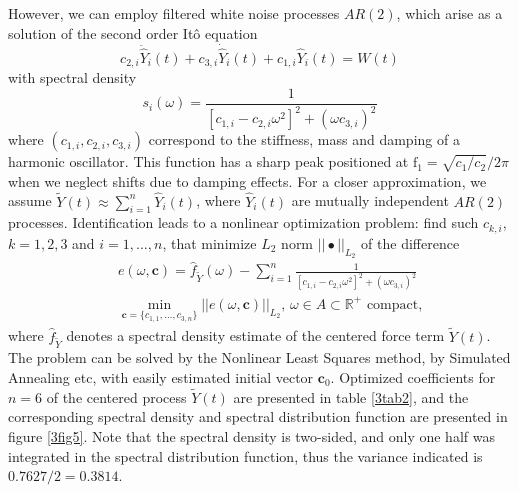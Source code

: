 \documentclass[preprint,12pt,authoryear]{elsarticle}
\newcommand{\bs}[1]{{\boldsymbol{#1}}}
\begin{document}
However, we can employ filtered white noise processes $AR(2)$, which arise as a solution of the second order It\^{o} equation
\begin{equation}
c_{2,i}\ddot{\hat{Y}}_i(t)+c_{3,i}\dot{\hat{Y}}_i(t)+c_{1,i}\hat{Y}_i(t)=W(t)
\label{3eq3}
\end{equation}
with spectral density
\begin{equation}
s_i(\omega)=\frac{1}{[c_{1,i}-c_{2,i}\omega^2]^2+(\omega c_{3,i})^2}
\label{3eq4}
\end{equation}
where $(c_{1,i},c_{2,i},c_{3,i})$ correspond to the stiffness, mass and damping of a harmonic oscillator. This function has a sharp peak positioned at $\mbox{f}_1=\sqrt{c_1/c_2}/2\pi$ when we neglect shifts due to damping effects. For a closer approximation, we assume $\tilde{Y}(t)\approx\sum_{i=1}^n\hat{Y}_i(t)$, where $\hat{Y}_i(t)$ are mutually independent $AR(2)$ processes. Identification leads to a nonlinear optimization problem: find such $c_{k,i}$, $k=1,2,3$ and $i=1,\dots,n$, that minimize $L_2$ norm $||\bullet||_{L_2}$ of the difference 
\begin{eqnarray}
&&e(\omega,\bs{c})=\hat{f}_{\tilde{Y}}(\omega)-\sum_{i=1}^n\frac{1}{[c_{1,i}-c_{2,i}\omega^2]^2+(\omega c_{3,i})^2}\label{3eq5}\\
&&\min_{\boldsymbol{c}=\{c_{1,1},\dots,c_{3,n}\}}||e(\omega,\bs{c})||_{L_2},\,\omega\in A\subset \mathbb{R}^+\mbox{ compact},\label{3eq6}
\end{eqnarray}
where $\hat{f}_{\tilde{Y}}$ denotes a spectral density estimate of the centered force term $\tilde{Y}(t)$. The problem can be solved by the Nonlinear Least Squares method, by Simulated Annealing etc, with easily estimated initial vector $\bs{c}_0$. Optimized coefficients for $n=6$ of the centered process $\tilde{Y}(t)$ are presented in table \ref{3tab2}, and the corresponding spectral density and spectral distribution function are presented in figure \ref{3fig5}. Note that the spectral density is two-sided, and only one half was integrated in the spectral distribution function, thus the variance indicated is $0.7627/2=0.3814$.
\end{document}
